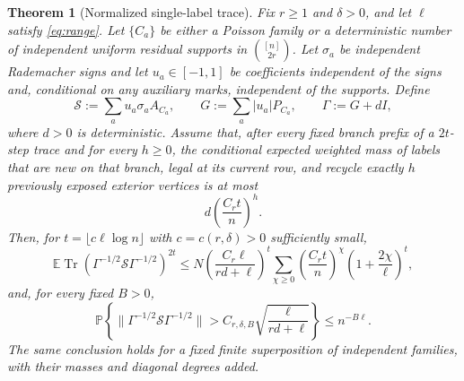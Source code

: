 \documentclass[11pt]{article}
\newtheorem{theorem}{Theorem}[section]
\theoremstyle{definition}
\theoremstyle{remark}
\newcommand{\E}{\mathbb E}
\newcommand{\bbP}{\mathbb P}
\newcommand{\1}{\mathbf 1}
\newcommand{\cS}{\mathcal S}
\DeclareMathOperator{\Tr}{Tr}
\numberwithin{equation}{section}
\begin{document}
\begin{theorem}[Normalized single-label trace]\label{thm:single-trace}
Fix $r\ge1$ and $\delta>0$, and let $\ell$ satisfy \cref{eq:range}.  Let
$\{C_a\}$ be either a Poisson family or a deterministic number of
independent uniform residual supports in $\binom{[n]}{2r}$.  Let
$\sigma_a$ be independent Rademacher signs and let $u_a\in[-1,1]$ be
coefficients independent of the signs and, conditional on any auxiliary
marks, independent of the supports.  Define
\begin{equation}\label{eq:single-operator}
 \cS:=\sum_a u_a\sigma_aA_{C_a},
 \qquad
 G:=\sum_a|u_a|P_{C_a},
 \qquad
 \Gamma:=G+dI,
\end{equation}
where $d>0$ is deterministic.  Assume that, after every fixed branch
prefix of a $2t$-step trace and for every $h\ge0$, the conditional expected
weighted mass of labels that are new on that branch, legal at its current
row, and recycle exactly $h$ previously exposed exterior vertices is at
most
\begin{equation}\label{eq:single-mass}
 d\left(\frac{C_rt}{n}\right)^h.
\end{equation}
Then, for $t=\lfloor c\ell\log n\rfloor$ with
$c=c(r,\delta)>0$ sufficiently small,
\begin{equation}\label{eq:single-moment}
 \E\Tr(\Gamma^{-1/2}\cS\Gamma^{-1/2})^{2t}
 \le N\left(\frac{C_r\ell}{rd+\ell}\right)^t
 \sum_{\chi\ge0}
 \left(\frac{C_rt}{n}\right)^\chi
 \left(1+\frac{2\chi}{\ell}\right)^t,
\end{equation}
and, for every fixed $B>0$,
\begin{equation}\label{eq:single-tail}
 \bbP\left\{
 \|\Gamma^{-1/2}\cS\Gamma^{-1/2}\|
 >C_{r,\delta,B}\sqrt{\frac{\ell}{rd+\ell}}
 \right\}\le n^{-B\ell}.
\end{equation}
The same conclusion holds for a fixed finite superposition of independent
families, with their masses and diagonal degrees added.
\end{theorem}
\end{document}
